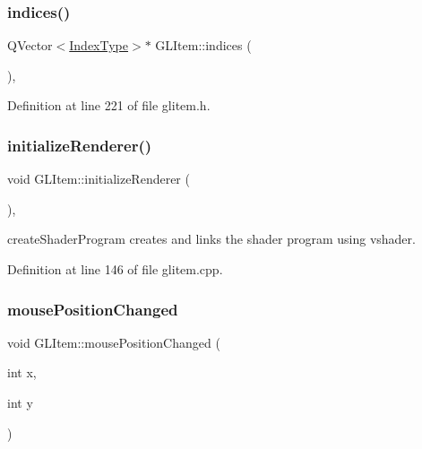 \subsubsection{\texorpdfstring{indices()}{indices()}}
{\footnotesize\ttfamily Q\+Vector$<$\mbox{\hyperlink{gldefines_8h_af3c748960f29c42e5b7f1dc449ab66ff}{Index\+Type}}$>$$\ast$ G\+L\+Item\+::indices (\begin{DoxyParamCaption}{ }\end{DoxyParamCaption})\hspace{0.3cm}{\ttfamily [inline]}, {\ttfamily [protected]}}



Definition at line 221 of file glitem.\+h.

\mbox{\label{class_g_l_item_aa77a50c3152b78113ba43752d20211f5}} 
\subsubsection{\texorpdfstring{initializeRenderer()}{initializeRenderer()}}
{\footnotesize\ttfamily void G\+L\+Item\+::initialize\+Renderer (\begin{DoxyParamCaption}{ }\end{DoxyParamCaption})\hspace{0.3cm}{\ttfamily [protected]}, {\ttfamily [virtual]}}



create\+Shader\+Program creates and links the shader program using vshader. 



Definition at line 146 of file glitem.\+cpp.

\mbox{\label{class_g_l_item_a52831365074bd5d082de828755ee8954}} 
\subsubsection{\texorpdfstring{mousePositionChanged}{mousePositionChanged}}
{\footnotesize\ttfamily void G\+L\+Item\+::mouse\+Position\+Changed (\begin{DoxyParamCaption}\item[{int}]{x,  }\item[{int}]{y }\end{DoxyParamCaption})\hspace{0.3cm}{\ttfamily [slot]}}



